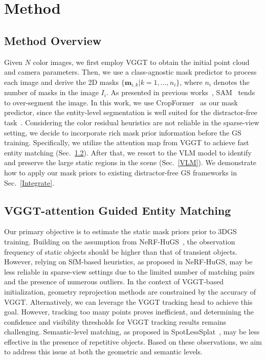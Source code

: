 \documentclass[letterpaper, 10 pt, conference]{ieeeconf}  %
\begin{document}
\section{Method}
\subsection{Method Overview}
Given $N$ color images, we first employ VGGT to obtain the initial point cloud and camera parameters. Then, we use a class-agnostic mask predictor to process each image and derive the 2D masks $\{\bm{m}_{i, k} | k = 1, ..., n_i\}$, where $n_i$ denotes the number of masks in the image $I_i$. As presented in previous works~\cite{ungermann2024robust}, SAM~\cite{kirillov2023segment} tends to over-segment the image. In this work, we use CropFormer~\cite{qi2023high} as our mask predictor, since the entity-level segmentation is well suited for the distractor-free task~\cite{otonari2024entity}. Considering the color residual heuristics are not reliable in the sparse-view setting, we decide to incorporate rich mask prior information before the GS training. Specifically, we utilize the attention map from VGGT to achieve fast entity matching (Sec.~\ref{attention_sec}). After that, we resort to the VLM model to identify and preserve the large static regions in the scene (Sec.~\ref{VLM}). We demonstrate how to apply our mask priors to existing distractor-free GS frameworks in Sec.~\ref{Integrate}.



\subsection{VGGT-attention Guided Entity Matching}
\label{attention_sec}
Our primary objective is to estimate the static mask priors prior to 3DGS training. Building on the assumption from NeRF-HuGS~\cite{chen2024nerf}, the observation frequency of static objects should be higher than that of transient objects. However, relying on SfM-based heuristics, as proposed in NeRF-HuGS, may be less reliable in sparse-view settings due to the limited number of matching pairs and the presence of numerous outliers. In the context of VGGT-based initialization, geometry reprojection methods are constrained by the accuracy of VGGT. Alternatively, we can leverage the VGGT tracking head to achieve this goal. However, tracking too many points proves inefficient, and determining the confidence and visibility thresholds for VGGT tracking results remains challenging. Semantic-level matching, as proposed in SpotLessSplat~\cite{sabour2025spotlesssplats}, may be less effective in the presence of repetitive objects. Based on these observations, we aim to address this issue at both the geometric and semantic levels.
\end{document}
